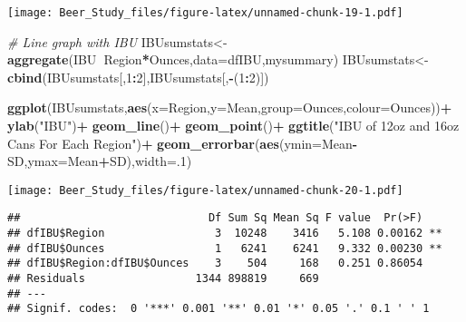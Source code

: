 \documentclass[
]{article}
\newenvironment{Shaded}{\begin{snugshade}}{\end{snugshade}}
\newcommand{\CommentTok}[1]{\textcolor[rgb]{0.56,0.35,0.01}{\textit{#1}}}
\newcommand{\DataTypeTok}[1]{\textcolor[rgb]{0.13,0.29,0.53}{#1}}
\newcommand{\DecValTok}[1]{\textcolor[rgb]{0.00,0.00,0.81}{#1}}
\newcommand{\KeywordTok}[1]{\textcolor[rgb]{0.13,0.29,0.53}{\textbf{#1}}}
\newcommand{\NormalTok}[1]{#1}
\newcommand{\OperatorTok}[1]{\textcolor[rgb]{0.81,0.36,0.00}{\textbf{#1}}}
\newcommand{\StringTok}[1]{\textcolor[rgb]{0.31,0.60,0.02}{#1}}
\begin{document}
\texttt{[image: Beer\_Study\_files/figure-latex/unnamed-chunk-19-1.pdf]}

\begin{Shaded}
\begin{Highlighting}[]
\CommentTok{# Line graph with IBU}
\NormalTok{IBUsumstats<-}\KeywordTok{aggregate}\NormalTok{(IBU}\OperatorTok{~}\NormalTok{Region}\OperatorTok{*}\NormalTok{Ounces,}\DataTypeTok{data=}\NormalTok{dfIBU,mysummary)}
\NormalTok{IBUsumstats<-}\KeywordTok{cbind}\NormalTok{(IBUsumstats[,}\DecValTok{1}\OperatorTok{:}\DecValTok{2}\NormalTok{],IBUsumstats[,}\OperatorTok{-}\NormalTok{(}\DecValTok{1}\OperatorTok{:}\DecValTok{2}\NormalTok{)])}

\KeywordTok{ggplot}\NormalTok{(IBUsumstats,}\KeywordTok{aes}\NormalTok{(}\DataTypeTok{x=}\NormalTok{Region,}\DataTypeTok{y=}\NormalTok{Mean,}\DataTypeTok{group=}\NormalTok{Ounces,}\DataTypeTok{colour=}\NormalTok{Ounces))}\OperatorTok{+}
\StringTok{  }\KeywordTok{ylab}\NormalTok{(}\StringTok{"IBU"}\NormalTok{)}\OperatorTok{+}
\StringTok{  }\KeywordTok{geom_line}\NormalTok{()}\OperatorTok{+}
\StringTok{  }\KeywordTok{geom_point}\NormalTok{()}\OperatorTok{+}
\StringTok{  }\KeywordTok{ggtitle}\NormalTok{(}\StringTok{"IBU of 12oz and 16oz Cans For Each Region"}\NormalTok{)}\OperatorTok{+}
\StringTok{  }\KeywordTok{geom_errorbar}\NormalTok{(}\KeywordTok{aes}\NormalTok{(}\DataTypeTok{ymin=}\NormalTok{Mean}\OperatorTok{-}\NormalTok{SD,}\DataTypeTok{ymax=}\NormalTok{Mean}\OperatorTok{+}\NormalTok{SD),}\DataTypeTok{width=}\NormalTok{.}\DecValTok{1}\NormalTok{)}
\end{Highlighting}
\end{Shaded}

\texttt{[image: Beer\_Study\_files/figure-latex/unnamed-chunk-20-1.pdf]}

\begin{Shaded}
\end{Shaded}

\begin{verbatim}
##                             Df Sum Sq Mean Sq F value  Pr(>F)   
## dfIBU$Region                 3  10248    3416   5.108 0.00162 **
## dfIBU$Ounces                 1   6241    6241   9.332 0.00230 **
## dfIBU$Region:dfIBU$Ounces    3    504     168   0.251 0.86054   
## Residuals                 1344 898819     669                   
## ---
## Signif. codes:  0 '***' 0.001 '**' 0.01 '*' 0.05 '.' 0.1 ' ' 1
\end{verbatim}
\end{document}
